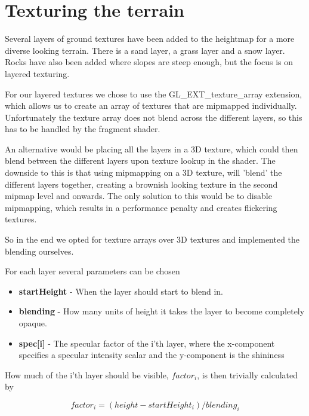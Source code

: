 \section{Texturing the terrain}

Several layers of ground textures have been added to the heightmap for
a more diverse looking terrain. There is a sand layer, a grass layer
and a snow layer. Rocks have also been added where slopes are steep
enough, but the focus is on layered texturing.


For our layered textures we chose to use the GL\_EXT\_texture\_array
extension, which allows us to create an array of textures that are
mipmapped individually. Unfortunately the texture array does not blend
across the different layers, so this has to be handled by the fragment
shader.


An alternative would be placing all the layers in a 3D texture, which
could then blend between the different layers upon texture lookup in
the shader. The downside to this is that using mipmapping on a 3D
texture, will 'blend' the different layers together, creating a
brownish looking texture in the second mipmap level and onwards. The
only solution to this would be to disable mipmapping, which results in
a performance penalty and creates flickering textures.

So in the end we opted for texture arrays over 3D textures and
implemented the blending ourselves.

For each layer several parameters can be chosen

\newcommand{\layerProp}[2]{\item \textbf{#1} - #2}
\begin{itemize}
  \layerProp{startHeight}{When the layer should start to blend in.}
  \layerProp{blending}{How many units of height it takes the layer to
    become completely opaque.}
  \layerProp{spec[i]}{The specular factor of the i'th layer, where the
    x-component specifies a specular intensity scalar and the
    y-component is the shininess}
\end{itemize}

How much of the i'th layer should be visible, $factor_i$, is then
trivially calculated by

\begin{displaymath}
  factor_i = (height - startHeight_i) / blending_i
\end{displaymath}

